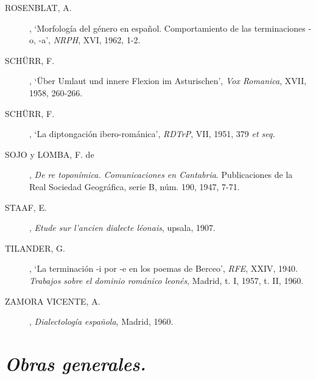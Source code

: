 \begin{description}
\item[ROSENBLAT, A.], `Morfología del género en español. Comportamiento de las terminaciones -o, -a', \textit{NRPH}, XVI, 1962, 1-2.
\item[SCHÜRR, F.], `Über Umlaut und innere Flexion im Asturischen', \textit{Vox Romanica}, XVII, 1958, 260-266.
\item[SCHÜRR, F.], `La diptongación ibero-románica', \textit{RDTrP}, VII, 1951, 379 \textit{et seq.}
\item[SOJO y LOMBA, F. de], \textit{De re toponímica. Comunicaciones en Cantabria}. Publicaciones de la Real Sociedad Geográfica, serie B, núm. 190, 1947, 7-71.
\item[STAAF, E.], \textit{Etude sur l'ancien dialecte léonais}, upsala, 1907.
\item[TILANDER, G.], `La terminación -i por -e en los poemas de Berceo', \textit{RFE}, XXIV, 1940. \textit{Trabajos sobre el dominio románico leonés}, Madrid, t. I, 1957, t. II, 1960.
\item[ZAMORA VICENTE, A.], \textit{Dialectología española}, Madrid, 1960.
\end{description}

\section{\emph{Obras generales.}}

\setcounter{subsection}{18}
